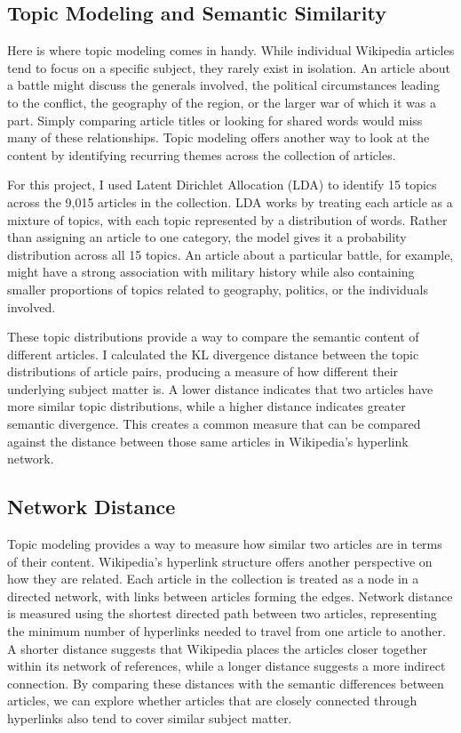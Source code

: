 \documentclass[
  letterpaper,
  DIV=11,
  numbers=noendperiod]{scrartcl}
\begin{document}
\subsection{Topic Modeling and Semantic
Similarity}\label{topic-modeling-and-semantic-similarity}

Here is where topic modeling comes in handy. While individual Wikipedia
articles tend to focus on a specific subject, they rarely exist in
isolation. An article about a battle might discuss the generals
involved, the political circumstances leading to the conflict, the
geography of the region, or the larger war of which it was a part.
Simply comparing article titles or looking for shared words would miss
many of these relationships. Topic modeling offers another way to look
at the content by identifying recurring themes across the collection of
articles.

For this project, I used Latent Dirichlet Allocation (LDA) to identify
15 topics across the 9,015 articles in the collection. LDA works by
treating each article as a mixture of topics, with each topic
represented by a distribution of words. Rather than assigning an article
to one category, the model gives it a probability distribution across
all 15 topics. An article about a particular battle, for example, might
have a strong association with military history while also containing
smaller proportions of topics related to geography, politics, or the
individuals involved.

These topic distributions provide a way to compare the semantic content
of different articles. I calculated the KL divergence distance between
the topic distributions of article pairs, producing a measure of how
different their underlying subject matter is. A lower distance indicates
that two articles have more similar topic distributions, while a higher
distance indicates greater semantic divergence. This creates a common
measure that can be compared against the distance between those same
articles in Wikipedia's hyperlink network.

\subsection{Network Distance}\label{network-distance}

Topic modeling provides a way to measure how similar two articles are in
terms of their content. Wikipedia's hyperlink structure offers another
perspective on how they are related. Each article in the collection is
treated as a node in a directed network, with links between articles
forming the edges. Network distance is measured using the shortest
directed path between two articles, representing the minimum number of
hyperlinks needed to travel from one article to another. A shorter
distance suggests that Wikipedia places the articles closer together
within its network of references, while a longer distance suggests a
more indirect connection. By comparing these distances with the semantic
differences between articles, we can explore whether articles that are
closely connected through hyperlinks also tend to cover similar subject
matter.
\end{document}
